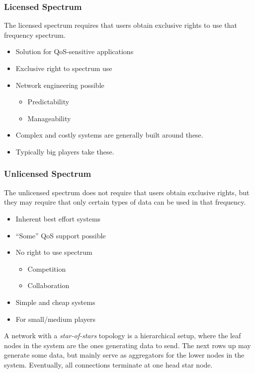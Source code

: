 \subsubsection{Licensed Spectrum}\label{subsubsec:Licensed_Spectrum}
The licensed spectrum requires that users obtain exclusive rights to use that frequency spectrum.
\begin{itemize}[noitemsep]
\item Solution for QoS-sensitive applications
\item Exclusive right to spectrum use
\item Network engineering possible
  \begin{itemize}[noitemsep]
  \item Predictability
  \item Manageability
  \end{itemize}

\item Complex and costly systems are generally built around these.
\item Typically big players take these.
\end{itemize}

\subsubsection{Unlicensed Spectrum}\label{subsubsec:Unlicensed_Spectrum}
The unlicensed spectrum does not require that users obtain exclusive rights, but they may require that only certain types of data can be used in that frequency.
\begin{itemize}[noitemsep]
\item Inherent best effort systems
\item ``Some'' QoS support possible
\item No right to use spectrum
  \begin{itemize}[noitemsep]
  \item Competition
  \item Collaboration
  \end{itemize}

\item Simple and cheap systems
\item For small/medium players
\end{itemize}

\begin{definition}\label{def:Star_of_Stars}
  A network with a \emph{star-of-stars} topology is a hierarchical setup, where the leaf nodes in the system are the ones generating data to send.
  The next rows up may generate some data, but mainly serve as aggregators for the lower nodes in the system.
  Eventually, all connections terminate at one head star node.
\end{definition}

